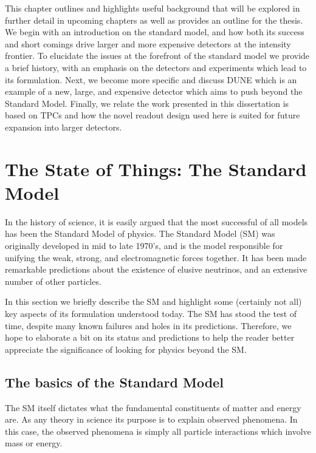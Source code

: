 This chapter outlines and highlights useful background that will be explored in further detail in upcoming chapters as well as provides an outline for the thesis.
We begin with an introduction on the standard model, and how both its success and short comings drive larger and more expensive detectors at the intensity frontier.
To elucidate the issues at the forefront of the standard model we provide a brief history, with an emphasis on the detectors and experiments which lead to its formulation.
Next, we become more specific and discuss DUNE which is an example of a new, large, and expensive detector which aims to push beyond the Standard Model.
Finally, we relate the work presented in this dissertation is based on TPCs and how the novel readout design used here is suited for future expansion into larger detectors.

\section{The State of Things: The Standard Model}

In the history of science, it is easily argued that the most successful of all models has been the Standard Model of physics.
The Standard Model (SM) was originally developed in mid to late 1970's, and is the model responsible for unifying the weak, strong, and electromagnetic forces together.
It has been made remarkable predictions about the existence of elusive neutrinos, and an extensive number of other particles.

In this section we briefly describe the SM and highlight some (certainly not all) key aspects of its formulation understood today.
The SM has stood the test of time, despite many known failures and holes in its predictions.
Therefore, we hope to elaborate a bit on its status and predictions to help the reader better appreciate the significance of looking for physics beyond the SM.

\subsection{The basics of the Standard Model}

The SM itself dictates what the fundamental constituents of matter and energy are.
As any theory in science its purpose is to explain observed phenomena.
In this case, the observed phenomena is simply all particle interactions which involve mass or energy.

